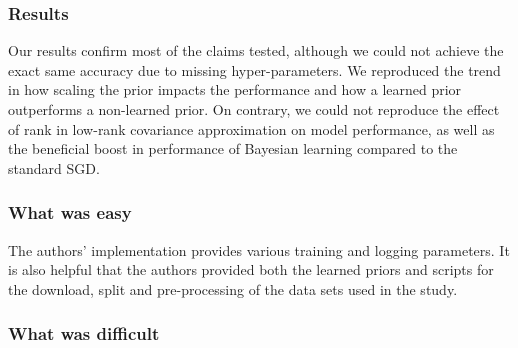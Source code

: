 \subsubsection*{Results}



Our results confirm most of the claims tested, although we could not achieve the exact same accuracy due to missing hyper-parameters. We reproduced the trend in how scaling the prior impacts the performance and how a learned prior outperforms a non-learned prior.
On contrary, we could not reproduce the effect of rank in low-rank covariance approximation on model performance, as well as the beneficial boost in performance of Bayesian learning compared to the standard SGD.


\subsubsection*{What was easy}

The authors' implementation provides various training and logging parameters. It is also helpful that the authors provided both the learned priors and scripts for the download, split and pre-processing of the data sets used in the study.

\subsubsection*{What was difficult}

